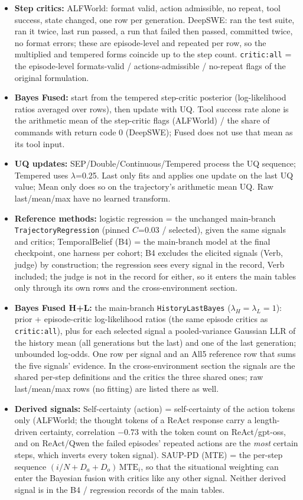 \documentclass[10pt,a4paper]{article}
\begin{document}
\begin{itemize}
\item \textbf{Step critics:} ALFWorld: format valid, action admissible, no repeat, tool success, state changed, one row per generation. DeepSWE: ran the test suite, ran it twice, last run passed, a run that failed then passed, committed twice, no format errors; these are episode-level and repeated per row, so the multiplied and tempered forms coincide up to the step count. \texttt{critic:all} = the episode-level formats-valid / actions-admissible / no-repeat flags of the original formulation.
\item \textbf{Bayes Fused:} start from the tempered step-critic posterior (log-likelihood ratios averaged over rows), then update with UQ. Tool success rate alone is the arithmetic mean of the step-critic flags (ALFWorld) / the share of commands with return code 0 (DeepSWE); Fused does not use that mean as its tool input.
\item \textbf{UQ updates:} SEP/Double/Continuous/Tempered process the UQ sequence; Tempered uses \ensuremath{\lambda}=0.25. Last only fits and applies one update on the last UQ value; Mean only does so on the trajectory's arithmetic mean UQ. Raw last/mean/max have no learned transform.
\item \textbf{Reference methods:} logistic regression = the unchanged main-branch \texttt{TrajectoryRegression} (pinned \ensuremath{C}=0.03 / selected), given the same signals and critics; TemporalBelief (B4) = the main-branch model at the final checkpoint, one harness per cohort; B4 excludes the elicited signals (Verb, judge) by construction; the regression sees every signal in the record, Verb included; the judge is not in the record for either, so it enters the main tables only through its own rows and the cross-environment section.
\item \textbf{Bayes Fused H+L:} the main-branch \texttt{HistoryLastBayes} (\ensuremath{\lambda_H=\lambda_L=1}): prior + episode-critic log-likelihood ratios (the same episode critics as \texttt{critic:all}), plus for each selected signal a pooled-variance Gaussian LLR of the history mean (all generations but the last) and one of the last generation; unbounded log-odds. One row per signal and an All5 reference row that sums the five signals' evidence. In the cross-environment section the signals are the shared per-step definitions and the critics the three shared ones; raw last/mean/max rows (no fitting) are listed there as well.
\item \textbf{Derived signals:} Self-certainty (action) = self-certainty of the action tokens only (ALFWorld; the thought tokens of a ReAct response carry a length-driven certainty, correlation \ensuremath{-0.73} with the token count on ReAct/gpt-oss, and on ReAct/Qwen the failed episodes' repeated actions are the \emph{most} certain steps, which inverts every token signal). SAUP-PD (MTE) = the per-step sequence \ensuremath{(i/N + D_a + D_o)\,\mathrm{MTE}_i}, so that the situational weighting can enter the Bayesian fusion with critics like any other signal. Neither derived signal is in the B4 / regression records of the main tables.

\end{itemize}
\end{document}

